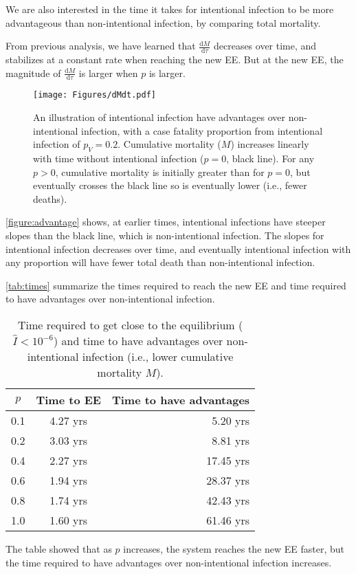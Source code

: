 \documentclass[12pt]{article}
\newcommand\dbyd[2]{\frac{\mathrm d{#1}}{\mathrm d{#2}}}
\newcommand{\pmV}{p_{V}}
\begin{document}
We are also interested in the time it takes for intentional infection to be more advantageous than non-intentional infection, by comparing total mortality.

From previous analysis, we have learned that $\dbyd{M}{\tau}$ decreases over time, and stabilizes at a constant rate when reaching the new EE. But at the new EE, the magnitude of $\dbyd{M}{\tau}$ is larger when $p$ is larger. 

\begin{figure}[H]
  \centering
  \texttt{[image: Figures/dMdt.pdf]}
  \caption{An illustration of intentional infection have advantages over non-intentional infection, with a case fatality proportion from intentional infection of $\pmV=0.2$.
Cumulative mortality ($M$) increases linearly with time without intentional infection ($p=0$, black line).
For any $p>0$, cumulative mortality is initially greater than for $p=0$, but eventually crosses the black line so is eventually lower (i.e., fewer deaths).}
\label{figure:advantage}
\end{figure}

\autoref{figure:advantage} shows, at earlier times, intentional infections have steeper slopes than the black line, which is non-intentional infection. The slopes for intentional infection decreases over time, and eventually intentional infection with any proportion will have fewer total death than non-intentional infection.

\autoref{tab:times} summarize the times required to reach the new EE and time required to have advantages over non-intentional infection.

\begin{table}[H]
\begin{center}
\caption{Time required to get close to the equilibrium ($\hat{I}<10^{-6}$) and time to have advantages over non-intentional infection (i.e., lower cumulative mortality $M$).}
\label{tab:times}
\smallskip
\begin{tabular}{c|c|r}
{\bfseries $p$} & {\bfseries Time to EE} & {\bfseries Time to have advantages} \\\hline
0.1 & 4.27 yrs & 5.20 yrs \\
0.2 & 3.03 yrs & 8.81 yrs \\
0.4 & 2.27 yrs & 17.45 yrs \\
0.6 & 1.94 yrs & 28.37 yrs \\
0.8 & 1.74 yrs & 42.43 yrs \\
1.0 & 1.60 yrs & 61.46 yrs
\end{tabular}
\end{center}
\end{table}
The table showed that as $p$ increases, the system reaches the new EE faster, but the time required to have advantages over non-intentional infection increases.
\end{document}
